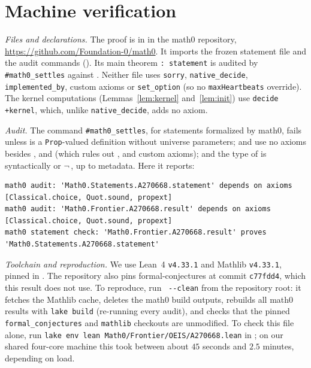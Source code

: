 \documentclass[11pt]{amsart}
\theoremstyle{plain}
\theoremstyle{definition}
\begin{document}
\section{Machine verification}\label{sec:lean}

\emph{Files and declarations.} The proof is in  in the math0 repository, \url{https://github.com/Foundation-0/math0}. It imports the frozen statement file and the audit commands (). Its main theorem  \texttt{: statement} is audited by \texttt{\#math0\_settles} against . Neither file uses \texttt{sorry}, \texttt{native\_decide}, \texttt{implemented\_by}, custom axioms or \texttt{set\_option} (so no \texttt{maxHeartbeats} override). The kernel computations (Lemmas~\ref{lem:kernel} and~\ref{lem:init}) use \texttt{decide +kernel}, which, unlike \texttt{native\_decide}, adds no axiom.

\emph{Audit.} The command \texttt{\#math0\_settles}, for statements formalized by math0, fails unless  is a \texttt{Prop}-valued definition without universe parameters;  and  use no axioms besides ,  and  (which rules out ,  and custom axioms); and the type of  is syntactically  or $\neg$\,, up to metadata. Here it reports:
\begin{lstlisting}[basicstyle=\ttfamily\scriptsize]
math0 audit: 'Math0.Statements.A270668.statement' depends on axioms [Classical.choice, Quot.sound, propext]
math0 audit: 'Math0.Frontier.A270668.result' depends on axioms [Classical.choice, Quot.sound, propext]
math0 statement check: 'Math0.Frontier.A270668.result' proves 'Math0.Statements.A270668.statement'
\end{lstlisting}

\emph{Toolchain and reproduction.} We use Lean~4 \cite{Lean4} \texttt{v4.33.1} and Mathlib \cite{Mathlib} \texttt{v4.33.1}, pinned in . The repository also pins formal-conjectures \cite{FC} at commit \texttt{c77fdd4}, which this result does not use. To reproduce, run ~\texttt{-{}-clean} from the repository root: it fetches the Mathlib cache, deletes the math0 build outputs, rebuilds all math0 results with \texttt{lake build} (re-running every audit), and checks that the pinned \texttt{formal\_conjectures} and \texttt{mathlib} checkouts are unmodified. To check this file alone, run \texttt{lake env lean Math0/Frontier/OEIS/A270668.lean} in ; on our shared four-core machine this took between about $45$ seconds and $2.5$ minutes, depending on load.
\end{document}
